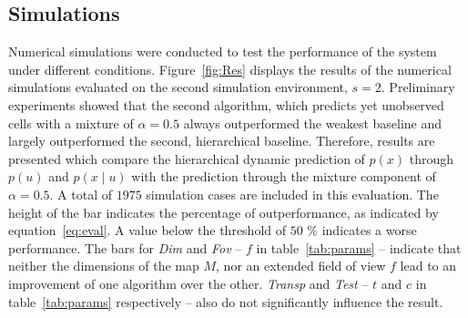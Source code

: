 \documentclass[twocolumn,letterpaper]{IEEEAerospaceCLS}  %
\begin{document}
\subsection{Simulations} \label{ssec:ResSim}
Numerical simulations were conducted to test the performance of the system under different conditions. Figure~\ref{fig:Res} displays the results of the numerical simulations evaluated on the second simulation environment, $s=2$. Preliminary experiments showed that the second algorithm, which predicts yet unobserved cells with a mixture of $\alpha = 0.5$ always outperformed the weakest baseline and largely outperformed the second, hierarchical baseline. Therefore, results are presented which compare the hierarchical dynamic prediction of $p(x)$ through $p(u)$ and $p(x\mid u)$ with the prediction through the mixture component of $\alpha = 0.5$. A total of $1975$ simulation cases are included in this evaluation. The height of the bar indicates the percentage of outperformance, as indicated by equation~\ref{eq:eval}. A value below the threshold of $50$ \% indicates a worse performance.
The bars for \emph{Dim} and \emph{Fov} -- $f$ in table~\ref{tab:params} -- indicate that neither the dimensions of the map $M$, nor an extended field of view $f$ lead to an improvement of one algorithm over the other. \emph{Transp} and \emph{Test} -- $t$ and $c$ in table~\ref{tab:params} respectively -- also do not significantly influence the result.
\end{document}
